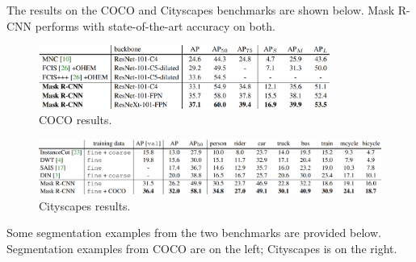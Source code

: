 \documentclass{article}
\begin{document}
The results on the COCO and Cityscapes benchmarks are shown below. Mask R-CNN performs with state-of-the-art accuracy on both.
\begin{figure}[htbp]
    \centering
     \includegraphics[width=0.85\textwidth]{cocoresults.PNG} %
    \caption{COCO results.}
\end{figure}
\begin{figure}[htbp]
    \centering
     \includegraphics[width=1\textwidth]{cityscapesresults.PNG} %
    \caption{Cityscapes results.}
\end{figure}

Some segmentation examples from the two benchmarks are provided below. Segmentation examples from COCO are on the left; Cityscapes is on the right.
\end{document}
